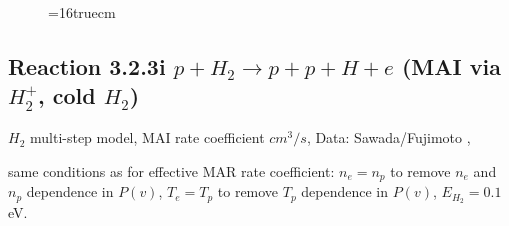 \documentclass[12pt,dvips]{article}
\begin{document}
\begin{figure} \label{2.2.5mad}
\epsfxsize=16truecm
\end{figure}
\newpage

\subsection{
Reaction 3.2.3i   $p + H_2   \rightarrow p + p + H +e $ (MAI via $H_2^+$, cold $H_2$)
}

$H_2$ multi-step model, MAI rate coefficient $cm^3/s$,
 Data: Sawada/Fujimoto ,\cite{kn:Sawada}

same conditions as for effective MAR rate coefficient: $n_e=n_p$ to remove $n_e$ and $n_p$ dependence in $P(v)$,
$T_e=T_p$ to remove $T_p$ dependence in $P(v)$,  $E_{H_2}=0.1$ eV.
\end{document}
